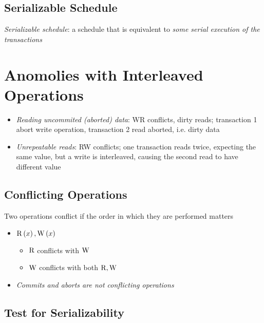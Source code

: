   \subsection{Serializable Schedule}

    \emph{Serializable schedule}: a schedule that is equivalent to \emph{some
    serial execution of the transactions}

\section{Anomolies with Interleaved Operations}

  \begin{itemize}
    \item \emph{Reading uncommited (aborted) data}: WR conflicts, dirty reads;
    transaction 1 abort write operation, transaction 2 read aborted, i.e. dirty data
    \item \emph{Unrepeatable reads}: RW conflicts; one transaction reads twice,
    expecting the same value, but a write is interleaved, causing the second read
    to have different value
  \end{itemize}

  \subsection{Conflicting Operations}

    Two operations conflict if the order in which they are performed matters

    \begin{itemize}
      \item $ \operatorname{R}\left( x \right), \operatorname{W}\left( x \right) $
      \begin{itemize}
        \item $ \operatorname{R} $ conflicts with $ \operatorname{W} $
        \item $ \operatorname{W} $ conflicts with both $ \operatorname{R}, \operatorname{W} $
      \end{itemize}

      \item \emph{Commits and aborts are not conflicting operations}
    \end{itemize}

  \subsection{Test for Serializability}

